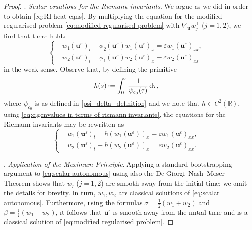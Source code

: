 \documentclass[11pt,a4paper,reqno]{amsart}
\numberwithin{equation}{section}
\theoremstyle{definition}
\theoremstyle{remark}
\newcommand{\bu}{\mathbf{u}}
\renewcommand{\d}{\, \mathrm{d}}
\newcommand*{\defeq}{\mathrel{\vcenter{\baselineskip0.5ex \lineskiplimit0pt
                     \hbox{\scriptsize.}\hbox{\scriptsize.}}}%
                     =}
\begin{document}
{\begin{proof}
\smallskip 
{}. \textit{Scalar equations for the Riemann invariants}. We argue as we did in order to obtain \eqref{eq:RI heat eqns}. By multiplying the equation for the modified regularised problem \eqref{eq:modified regularised problem} with $\nabla_{\bu}w_j^\intercal$ ($j=1,2$), we find that there holds 
\begin{equation*}
   \left\lbrace \begin{aligned}
        & w_1(\bu^\varepsilon)_t + \phi_2(\bu^\varepsilon) w_1(\bu^\varepsilon)_x = \varepsilon w_1(\bu^\varepsilon)_{xx}, \\ 
        & w_2(\bu^\varepsilon)_t + \phi_1(\bu^\varepsilon) w_2(\bu^\varepsilon)_x = \varepsilon w_2(\bu^\varepsilon)_{xx} 
    \end{aligned}\right. 
\end{equation*}
in the weak sense. Observe that, by defining the primitive 
\begin{equation*}
    h(s)  \defeq  \int_0^s \frac{1}{\psi_{c_0}(\tau)} \d \tau, 
\end{equation*}
where $\psi_{c_0}$ is as defined in \eqref{psi_delta_definition} and we note that $h \in C^2(\mathbb{R})$, using \eqref{eq:eigenvalues in terms of riemann invariants}, the equations for the Riemann invariants may be rewritten as 
\begin{equation}\label{eq:scalar autonomous}
 \left\lbrace  \begin{aligned}
       &w_1(\bu^\varepsilon)_t + h(w_1(\bu^\varepsilon))_x = \varepsilon w_1(\bu^\varepsilon)_{xx}, \\ 
       &w_2(\bu^\varepsilon)_t - h(w_2(\bu^\varepsilon))_x = \varepsilon w_2(\bu^\varepsilon)_{xx}. 
   \end{aligned} \right. 
\end{equation}

\smallskip 
{}. \textit{Application of the Maximum Principle}. Applying a standard bootstrapping argument to \eqref{eq:scalar autonomous} using also the De Giorgi--Nash--Moser Theorem shows that $w_j$ ($j=1,2$) are smooth away from the initial time; we omit the details for brevity. In turn, $w_1,w_2$ are classical solutions of \eqref{eq:scalar autonomous}. Furthermore, using the formulas $\sigma = \frac{1}{2}(w_1+w_2)$ and $\beta = \frac{1}{2}(w_1-w_2)$, it follows that $\bu^\varepsilon$ is smooth away from the initial time and is a classical solution of \eqref{eq:modified regularised problem}. 


\end{proof}}
\end{document}
